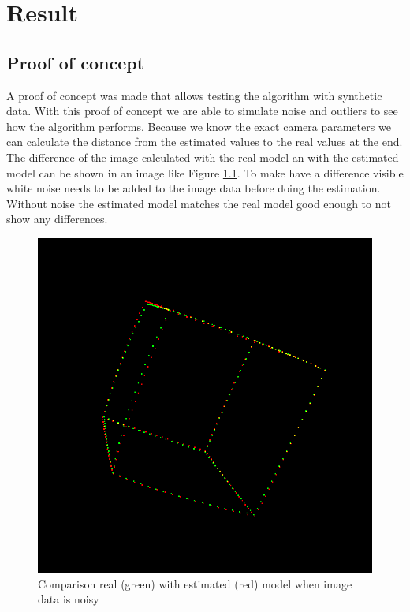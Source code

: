\documentclass[11pt,a4paper,titlepage,oneside]{report}
\begin{document}
\chapter{Result}
\section{Proof of concept}
A proof of concept was made that allows testing the algorithm with synthetic data. With this proof of concept we are able to simulate noise and outliers to see how the algorithm performs. Because we know the exact camera parameters we can calculate the distance from the estimated values to the real values at the end. The difference of the image calculated with the real model an with the estimated model can be shown in an image like Figure \ref{fig:diff_img}. To make have a difference visible white noise needs to be added to the image data before doing the estimation. Without noise the estimated model matches the real model good enough to not show any differences.
\begin{figure}[H]
  \begin{center}
		\includegraphics[width=1.0\textwidth]{img/diff_img.png}
  \end{center}
	\caption{Comparison real (green) with estimated (red) model when image data is noisy}\label{fig:diff_img}
\end{figure}
\end{document}
